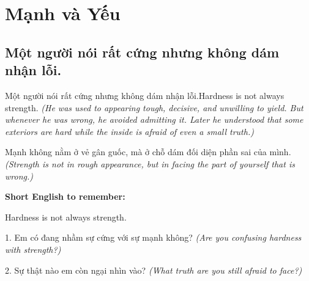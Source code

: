 \chapter{Mạnh và Yếu}

\section{Một người nói rất cứng nhưng không dám nhận lỗi.}
\begin{truyen}{Một người nói rất cứng nhưng không dám nhận lỗi.}{Hardness is not always strength.}
\textit{(He was used to appearing tough, decisive, and unwilling to yield. But whenever he was wrong, he avoided admitting it. Later he understood that some exteriors are hard while the inside is afraid of even a small truth.)}
\end{truyen}
\begin{baihoc}
Mạnh không nằm ở vẻ gân guốc, mà ở chỗ dám đối diện phần sai của mình.
\textit{(Strength is not in rough appearance, but in facing the part of yourself that is wrong.)}
\end{baihoc}
\begin{ghinhoanh}
\textbf{Short English to remember:}

Hardness is not always strength.
\end{ghinhoanh}
\begin{tuhocnhanh}
1. Em có đang nhầm sự cứng với sự mạnh không? \textit{(Are you confusing hardness with strength?)}

2. Sự thật nào em còn ngại nhìn vào? \textit{(What truth are you still afraid to face?)}
\end{tuhocnhanh}
\ngancach

